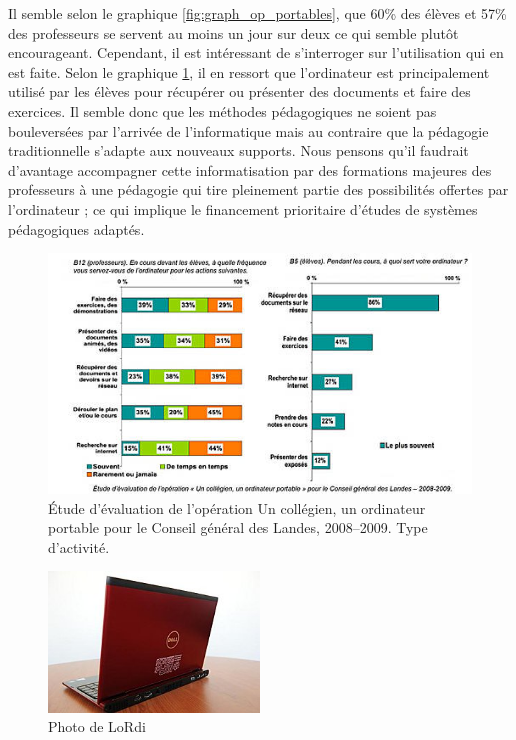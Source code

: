 Il semble selon le graphique \ref{fig:graph_op_portables}\cite{portables60}, que
60\% des élèves et 57\% des professeurs se servent au moins un jour
sur deux ce qui semble plutôt encourageant. Cependant, il est
intéressant de s'interroger sur l'utilisation qui en est faite. Selon
le graphique \ref{fig:graph_op_portables2}, il en ressort que
l'ordinateur est principalement utilisé par les élèves pour
récupérer ou présenter des documents et faire des exercices. Il semble
donc que les méthodes pédagogiques ne soient pas bouleversées par l'arrivée
de l'informatique mais au contraire que la pédagogie traditionnelle
s'adapte aux nouveaux supports. Nous pensons qu'il faudrait d'avantage
accompagner cette informatisation par des formations majeures des
professeurs à une pédagogie qui tire pleinement partie des
possibilités offertes par l'ordinateur ; ce qui implique le financement
prioritaire d'études de systèmes pédagogiques adaptés.


\begin{figure}[h]
	\begin{center}
		\includegraphics[width=\textwidth]{../resources/illustrations/usage_portables_act}
	\caption{Étude d'évaluation de l'opération \og Un collégien,
          un ordinateur portable \fg{} pour le Conseil général des
          Landes, 2008--2009. Type d'activité.}
	\label{fig:graph_op_portables2}
	\end{center}
\end{figure}


\begin{figure}[H]
  \begin{center}
    \includegraphics[width=0.5\textwidth]{../resources/illustrations/lordi}
    \caption{Photo de LoRdi}
  \end{center}
\end{figure}

